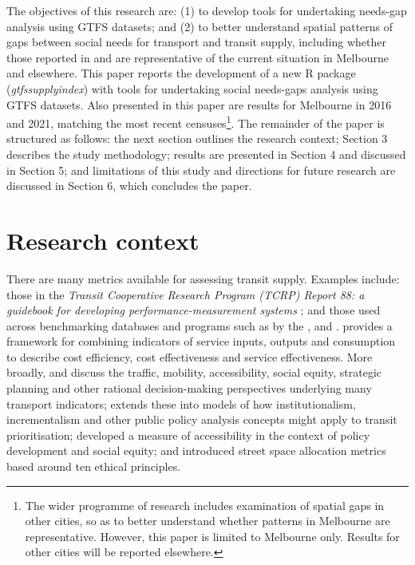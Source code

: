\documentclass[preprint, 3p,
authoryear]{elsarticle} %
\begin{document}
The objectives of this research are: (1) to develop tools for
undertaking needs-gap analysis using GTFS datasets; and (2) to better
understand spatial patterns of gaps between social needs for transport
and transit supply, including whether those reported in
\citet{Currie2007Identifying} and \citet{currie2010identifying} are
representative of the current situation in Melbourne and elsewhere. This
paper reports the development of a new R package
(\emph{gtfssupplyindex}) with tools for undertaking social needs-gaps
analysis using GTFS datasets. Also presented in this paper are results
for Melbourne in 2016 and 2021, matching the most recent
censuses\footnote{The wider programme of research includes examination
  of spatial gaps in other cities, so as to better understand whether
  patterns in Melbourne are representative. However, this paper is
  limited to Melbourne only. Results for other cities will be reported
  elsewhere.}. The remainder of the paper is structured as follows: the
next section outlines the research context; Section 3 describes the
study methodology; results are presented in Section 4 and discussed in
Section 5; and limitations of this study and directions for future
research are discussed in Section 6, which concludes the paper.

\section{Research context}\label{research-context}

There are many metrics available for assessing transit supply. Examples
include: those in the \emph{Transit Cooperative Research Program (TCRP)
Report 88: a guidebook for developing performance-measurement systems}
\citep{Ryus:2003aa}; and those used across benchmarking databases and
programs such as by the
\citet{Florida-Transit-Information-System:2018aa}, \citet{UITP:2015aa}
and \citet{Imperial-College-London:2023aa}.
\citet{FieldingGordonJ1987Mpts} provides a framework for combining
indicators of service inputs, outputs and consumption to describe cost
efficiency, cost effectiveness and service effectiveness. More broadly,
\citet{Litman:2003ab} and \citet{Litman:2016aa} discuss the traffic,
mobility, accessibility, social equity, strategic planning and other
rational decision-making perspectives underlying many transport
indicators; \citet{Reynolds:2017ah} extends these into models of how
institutionalism, incrementalism and other public policy analysis
concepts might apply to transit prioritisation;
\citet{GuzmanLuisA.2017Aeit} developed a measure of accessibility in the
context of policy development and social equity; and
\citet{Creutzig2020streetspaceallocation} introduced street space
allocation metrics based around ten ethical principles.
\end{document}
